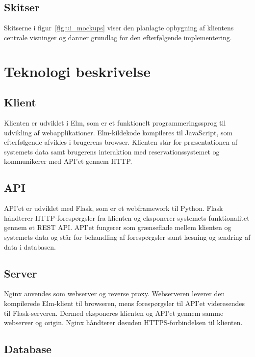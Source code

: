 \documentclass[a4paper, 11pt]{article}
\begin{document}
\subsection{Skitser}

Skitserne i figur~\ref{fig:ui_mockups} viser den planlagte opbygning af klientens centrale
visninger og danner grundlag for den efterfølgende implementering.

\newpage

\section{Teknologi beskrivelse}

\subsection{Klient}

Klienten er udviklet i Elm, som er et funktionelt programmeringssprog til udvikling af
webapplikationer. Elm-kildekode kompileres til JavaScript, som efterfølgende afvikles i
brugerens browser. Klienten står for præsentationen af systemets data samt brugerens
interaktion med reservationssystemet og kommunikerer med API'et gennem HTTP.

\subsection{API}

API'et er udviklet med Flask, som er et webframework til Python. Flask håndterer
HTTP-forespørgsler fra klienten og eksponerer systemets funktionalitet gennem et REST API.
API'et fungerer som grænseflade mellem klienten og systemets data og står for behandling af
forespørgsler samt læsning og ændring af data i databasen.

\subsection{Server}

Nginx anvendes som webserver og reverse proxy. Webserveren leverer den kompilerede
Elm-klient til browseren, mens forespørgsler til API'et videresendes til Flask-serveren.
Dermed eksponeres klienten og API'et gennem samme webserver og origin. Nginx håndterer
desuden HTTPS-forbindelsen til klienten.

\subsection{Database}
\end{document}
